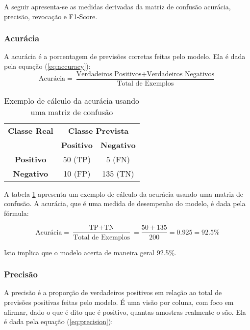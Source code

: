 A seguir apresenta-se as medidas derivadas da matriz de confusão acurácia, precisão, revocação e F1-Score. 

\subsubsection{Acurácia}
A acurácia é a porcentagem de previsões corretas feitas pelo modelo. Ela é dada pela equação (\ref{eq:accuracy}):
\begin{equation}
\text{Acurácia} = \frac{\text{Verdadeiros Positivos} + \text{Verdadeiros Negativos}}{\text{Total de Exemplos}} \label{eq:accuracy}
\end{equation}

\begin{table}[h]
\centering
\caption{Exemplo de cálculo da acurácia usando uma matriz de confusão}
\label{tab:exemplo_acuracia}
\begin{tabular}{c|cc}
\multicolumn{1}{c}{\textbf{Classe Real}} & \multicolumn{2}{c}{\textbf{Classe Prevista}} \\ \cline{2-3}
\multicolumn{1}{c}{} & \textbf{Positivo} & \textbf{Negativo} \\ \hline
\multicolumn{1}{c}{\textbf{Positivo}} & \cellcolor{green!25}50 (TP) & \cellcolor{red!25}5 (FN) \\
\multicolumn{1}{c}{\textbf{Negativo}} & \cellcolor{red!25}10 (FP) & \cellcolor{green!25}135 (TN) \\ \hline
\end{tabular}
\end{table}

A tabela \ref{tab:exemplo_acuracia} apresenta um exemplo de cálculo da acurácia usando uma matriz de confusão. A acurácia, que é uma medida de desempenho do modelo, é dada pela fórmula:

\[ \text{Acurácia} = \frac{\text{TP} + \text{TN}}{\text{Total de Exemplos}} = \frac{50 + 135}{200} = 0.925 = 92.5\%\]

Isto implica que o modelo acerta de maneira geral 92.5\%.

\subsubsection{Precisão}

A precisão é a proporção de verdadeiros positivos em relação ao total de previsões positivas feitas pelo modelo. É uma visão por coluna, com foco em afirmar, dado o que é dito que é positivo, quantas amostras realmente o são.  Ela é dada pela equação (\ref{eq:precision}):

